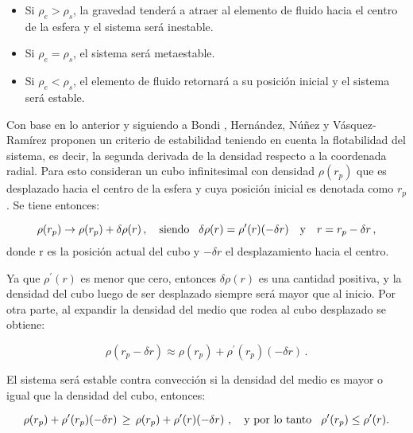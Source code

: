\documentclass[letterpaper,11pt]{article}
\begin{document}
\begin{itemize}
    \item Si $\rho_{e} > \rho_{s}$, la gravedad tenderá a atraer al elemento de fluido hacia el centro de la esfera y el sistema será inestable.
    \item Si $\rho_{e} = \rho_{s}$, el sistema será metaestable.
    \item Si $\rho_{e} < \rho_{s}$, el elemento de fluido retornará a su posición inicial y el sistema será estable.
\end{itemize}

Con base en lo anterior y siguiendo a Bondi \cite{Bondi1964B}, Hernández, Núñez y Vásquez-Ramírez \cite{hernandez2018convection} proponen un criterio de estabilidad teniendo en cuenta la flotabilidad del sistema, es decir, la segunda derivada de la densidad respecto a la coordenada radial. Para esto consideran un cubo infinitesimal con densidad $\rho(r_p)$  que es desplazado hacia el centro de la esfera y cuya posición inicial es denotada como $r_p$. Se tiene entonces:

\begin{equation*}
    \rho (r_{p}) \rightarrow \rho (r_{p}) + \delta \rho(r) \, , \quad \text{siendo} \hspace{3mm} \delta \rho (r) = \rho^{\prime} (r)(- \delta r) \quad \text{y} \quad r = r_{p} - \delta r \, ,
\end{equation*}
donde r es la posición actual del cubo y $- \delta r$ el desplazamiento hacia el centro.

Ya que $\rho^{\prime}(r)$ es menor que cero, entonces $\delta \rho (r)$ es una cantidad positiva, y la densidad del cubo luego de ser desplazado siempre será mayor que al inicio. Por otra parte, al expandir la densidad del medio que rodea al cubo desplazado se obtiene:

\begin{equation}
    \rho (r_{p} - \delta r) \approx \rho (r_{p}) + \rho^{\prime} (r_{p})(- \delta r) \, .
\end{equation}

El sistema será estable contra convección si la densidad del medio es mayor o igual que la densidad del cubo, entonces:

\begin{equation*}
    \rho(r_{p}) + \rho^{\prime} (r_{p})(- \delta r) \, \geq \, \rho(r_{p}) + \rho^{\prime}(r)(- \delta r) \, \, , \quad \text{y por lo tanto} \hspace{3mm} \rho^{\prime}(r_{p}) \leq \rho^{\prime}(r).
\end{equation*}
\end{document}
